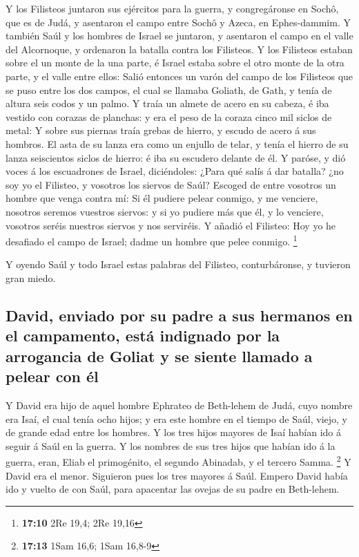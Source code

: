  Y los Filisteos juntaron sus ejércitos para la guerra, y
congregáronse en Sochô, que es de Judá, y asentaron el campo entre Sochô
y Azeca, en Ephes-dammim.  Y también Saúl y los hombres de
Israel se juntaron, y asentaron el campo en el valle del Alcornoque, y
ordenaron la batalla contra los Filisteos.  Y los
Filisteos estaban sobre el un monte de la una parte, é Israel estaba
sobre el otro monte de la otra parte, y el valle entre ellos:
 Salió entonces un varón del campo de los Filisteos que se
puso entre los dos campos, el cual se llamaba Goliath, de Gath, y tenía
de altura seis codos y un palmo.  Y traía un almete de
acero en su cabeza, é iba vestido con corazas de planchas: y era el peso
de la coraza cinco mil siclos de metal:  Y sobre sus
piernas traía grebas de hierro, y escudo de acero á sus hombros.
 El asta de su lanza era como un enjullo de telar, y tenía
el hierro de su lanza seiscientos siclos de hierro: é iba su escudero
delante de él.  Y paróse, y dió voces á los escuadrones de
Israel, diciéndoles: ¿Para qué salís á dar batalla? ¿no soy yo el
Filisteo, y vosotros los siervos de Saúl? Escoged de entre vosotros un
hombre que venga contra mí:  Si él pudiere pelear conmigo,
y me venciere, nosotros seremos vuestros siervos: y si yo pudiere más
que él, y lo venciere, vosotros seréis nuestros siervos y nos serviréis.
 Y añadió el Filisteo: Hoy yo he desafiado el campo de
Israel; dadme un hombre que pelee conmigo. \footnote{\textbf{17:10} 2Re
  19,4; 2Re 19,16}

 Y oyendo Saúl y todo Israel estas palabras del Filisteo,
conturbáronse, y tuvieron gran miedo.

\hypertarget{david-enviado-por-su-padre-a-sus-hermanos-en-el-campamento-estuxe1-indignado-por-la-arrogancia-de-goliat-y-se-siente-llamado-a-pelear-con-uxe9l}{%
\subsection{David, enviado por su padre a sus hermanos en el campamento,
está indignado por la arrogancia de Goliat y se siente llamado a pelear
con
él}\label{david-enviado-por-su-padre-a-sus-hermanos-en-el-campamento-estuxe1-indignado-por-la-arrogancia-de-goliat-y-se-siente-llamado-a-pelear-con-uxe9l}}

 Y David era hijo de aquel hombre Ephrateo de Beth-lehem
de Judá, cuyo nombre era Isaí, el cual tenía ocho hijos; y era este
hombre en el tiempo de Saúl, viejo, y de grande edad entre los hombres.
 Y los tres hijos mayores de Isaí habían ido á seguir á
Saúl en la guerra. Y los nombres de sus tres hijos que habían ido á la
guerra, eran, Eliab el primogénito, el segundo Abinadab, y el tercero
Samma. \footnote{\textbf{17:13} 1Sam 16,6; 1Sam 16,8-9} 
Y David era el menor. Siguieron pues los tres mayores á Saúl.
 Empero David había ido y vuelto de con Saúl, para
apacentar las ovejas de su padre en Beth-lehem.

